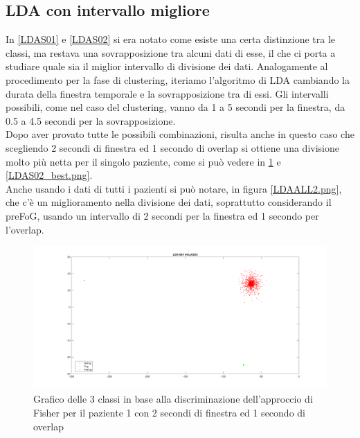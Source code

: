 \subsection{LDA con intervallo migliore}
In \ref{LDAS01} e \ref{LDAS02} si era notato come esiste una certa distinzione tra le classi, ma restava una sovrapposizione tra alcuni dati di esse, il che ci porta a studiare quale sia il miglior intervallo di divisione dei dati. Analogamente al procedimento per la fase di clustering, iteriamo l'algoritmo di LDA cambiando la durata della finestra temporale e la sovrapposizione tra di essi. Gli intervalli possibili, come nel caso del clustering, vanno da 1 a 5 secondi per la finestra, da 0.5 a 4.5 secondi per la sovrapposizione.\\
Dopo aver provato tutte le possibili combinazioni, risulta anche in questo caso che scegliendo 2 secondi di finestra ed 1 secondo di overlap si ottiene una divisione molto più netta per il singolo paziente, come si può vedere in \ref{LDAS01_best.png} e \ref{LDAS02_best.png}.\\
Anche usando i dati di tutti i pazienti si può notare, in figura \ref{LDAALL2.png}, che c'è un miglioramento nella divisione dei dati, soprattutto considerando il preFoG, usando un intervallo di 2 secondi per la finestra ed 1 secondo per l'overlap.
\begin{figure}[]
	\centering
	\includegraphics[scale=0.25]{images/LDAS01_best.png}
	\caption{Grafico delle 3 classi in base alla discriminazione dell'approccio di Fisher per il paziente 1 con 2 secondi di finestra ed 1 secondo di overlap}
	\label{LDAS01_best.png}
\end{figure}
